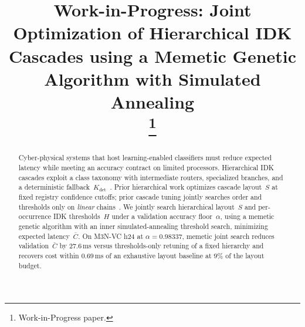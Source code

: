 \documentclass[conference]{IEEEtran}
\begin{document}
\title{Work-in-Progress: Joint Optimization of Hierarchical IDK Cascades using a Memetic Genetic Algorithm with Simulated Annealing\\
\thanks{Work-in-Progress paper.}
}

\author{
\and
{}
\and
{}
\and
{}
\and
{}
}

\maketitle

\begin{abstract}
Cyber-physical systems that host learning-enabled classifiers must reduce expected latency while meeting an accuracy contract on limited processors.
Hierarchical IDK cascades exploit a class taxonomy with intermediate routers, specialized branches, and a deterministic fallback~$K_{\mathrm{det}}$~\cite{baruah2025timely}.
Prior hierarchical work optimizes cascade layout~$S$ at fixed registry confidence cutoffs; prior cascade tuning jointly searches order and thresholds only on \emph{linear} chains~\cite{chellapilla2006combining,markatopoulou2016ordering}.
We jointly search hierarchical layout~$S$ and per-occurrence IDK thresholds~$H$ under a validation accuracy floor~$\alpha$, using a memetic genetic algorithm with an inner simulated-annealing threshold search, minimizing expected latency~$\bar{C}$.
On M3N-VC h24 at $\alpha{=}0.98337$, memetic joint search reduces validation~$\bar{C}$ by $27.6$\,ms versus thresholds-only retuning of a fixed hierarchy and recovers cost within $0.69$\,ms of an exhaustive layout baseline at $9\%$ of the layout budget.
\end{abstract}
\end{document}
